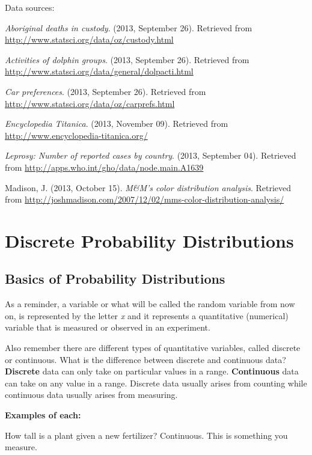 \documentclass[]{book}
\begin{document}
Data sources:

\emph{Aboriginal deaths in custody}. (2013, September 26). Retrieved from
\url{http://www.statsci.org/data/oz/custody.html}

\emph{Activities of dolphin groups}. (2013, September 26). Retrieved from
\url{http://www.statsci.org/data/general/dolpacti.html}

\emph{Car preferences}. (2013, September 26). Retrieved from
\url{http://www.statsci.org/data/oz/carprefs.html}

\emph{Encyclopedia Titanica}. (2013, November 09). Retrieved from
\url{http://www.encyclopedia-titanica.org/}

\emph{Leprosy: Number of reported cases by country}. (2013, September 04).
Retrieved from \url{http://apps.who.int/gho/data/node.main.A1639}

Madison, J. (2013, October 15). \emph{M\&M's color distribution analysis}.
Retrieved from
\url{http://joshmadison.com/2007/12/02/mms-color-distribution-analysis/}

\hypertarget{discrete-probability-distributions}{%
\chapter{Discrete Probability Distributions}\label{discrete-probability-distributions}}

\hypertarget{basics-of-probability-distributions}{%
\section{Basics of Probability Distributions}\label{basics-of-probability-distributions}}

As a reminder, a variable or what will be called the random variable from now on, is represented by the letter \emph{x} and it represents a quantitative (numerical) variable that is measured or observed in an experiment.

Also remember there are different types of quantitative variables, called discrete or continuous. What is the difference between discrete and continuous data? \textbf{Discrete} data can only take on particular values in a range. \textbf{Continuous} data can take on any value in a range. Discrete data usually arises from counting while continuous data usually arises from measuring.

\textbf{Examples of each:}

How tall is a plant given a new fertilizer? Continuous. This is something you measure.
\end{document}
